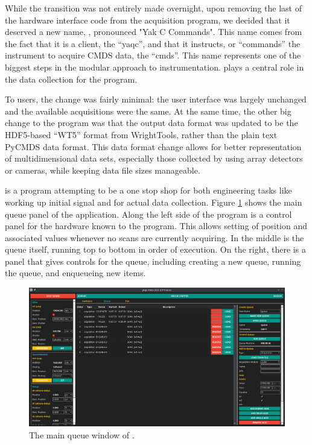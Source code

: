 While the transition was not entirely made overnight, upon removing the last of the hardware interface code from the acquisition program, we decided that it deserved a new name, \yaqccmds{}, pronounced "Yak C Commands".
This name comes from the fact that it is a \yaq{} client, the ``yaqc'', and that it instructs, or ``commands'' the instrument to acquire CMDS data, the ``cmds''.
This name represents one of the biggest steps in the modular approach to instrumentation.
\yaq{} plays a central role in the data collection for the program.

To users, the change was fairly minimal: the user interface was largely unchanged and the available acquisitions were the same.
At the same time, the other big change to the program was that the output data format was updated to be the HDF5-based ``WT5'' format from WrightTools, rather than the plain text PyCMDS data format.
This data format change allows for better representation of multidimensional data sets, especially those collected by using array detectors or cameras, while keeping data file sizes manageable.

\yaqccmds{} is a program attempting to be a one stop shop for both engineering tasks like working up initial signal and for actual data collection.
Figure \ref{acq:fig:yaqccmds} shows the main queue panel of the application.
Along the left side of the program is a control panel for the hardware known to the program.
This allows setting of position and associated values whenever no scans are currently acquiring.
In the middle is the queue itself, running top to bottom in order of execution.
On the right, there is a panel that gives controls for the queue, including creating a new queue, running the queue, and enqueueing new items.

\begin{landscape}
\begin{figure}
\includegraphics[width=9in]{"acquisition/images/yaqc-cmds"}
\caption[yaqc-cmds]{
	The main queue window of \yaqccmds{}.
}
\label{acq:fig:yaqccmds}
\end{figure}
\end{landscape}

